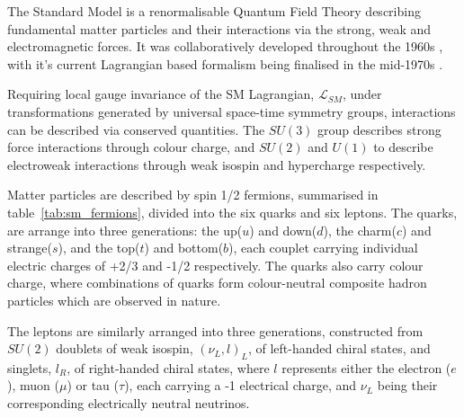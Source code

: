 The Standard Model is a renormalisable Quantum Field Theory describing
fundamental matter particles and their interactions via the strong,
weak and electromagnetic forces. It was collaboratively developed throughout the
1960s \cite
{Glashow1961579,PhysRevLett.19.1264,Salam:1968rm,PhysRevLett.30.1346,PhysRevLett.30.1343}, with it's current Lagrangian
based formalism being finalised in the mid-1970s \cite{martinAndShaw}.

Requiring local gauge invariance of the SM Lagrangian, $\mathcal{L}_{SM}$,
under
transformations generated by universal space-time symmetry groups,
interactions can be described via conserved quantities. The $SU(3)$ group
describes strong force interactions through colour charge, and $SU(2)$ and $U(1)$ to
describe electroweak interactions through weak isospin and hypercharge respectively.


Matter particles are described by spin 1/2 fermions, summarised in
table~\ref{tab:sm_fermions}, divided into the six quarks
and six leptons. The quarks, are arrange into three generations: the up($u$) and
down($d$), the charm($c$) and strange($s$), and the top($t$) and bottom($b$),
each couplet carrying
individual electric charges of +2/3 and -1/2 respectively. The quarks also carry
colour charge, where combinations of quarks form colour-neutral composite
hadron particles which are observed in nature.


The leptons are similarly arranged into three generations, constructed from
$SU(2)$
doublets of weak isospin, $(\nu_L, l)_L$, of left-handed chiral states, and
singlets, $l_R$, of right-handed chiral states, where $l$ represents either the
electron ($e$), muon ($\mu$) or tau ($\tau$), each carrying a -1 electrical
charge, and $\nu_L$ being their corresponding electrically neutral neutrinos.


